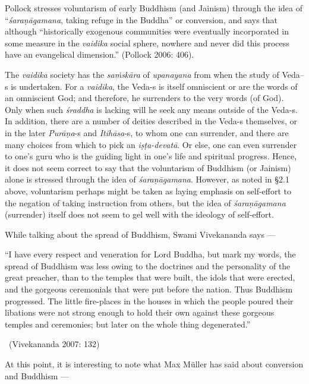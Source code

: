 Pollock stresses voluntarism of early Buddhism (and Jainism) through the idea of “\textit{śaraṇāgamana}, taking refuge in the Buddha” or conversion, and says that although “historically exogenous communities were eventually incorporated in some measure in the \textit{vaidika} social sphere, nowhere and never did this process have an evangelical dimension.” (Pollock 2006: 406).

The \textit{vaidika} society has the \textit{saṁskāra} of \textit{upanayana} from when the study of Veda--s is undertaken. For a \textit{vaidika}, the Veda-s is itself omniscient or are the words of an omniscient God; and therefore, he surrenders to the very words (of God). Only when such \textit{śraddha} is lacking will he seek any means outside of the Veda-s. In addition, there are a number of deities described in the Veda-s themselves, or in the later \textit{Purāṇa}-s and \textit{Itihāsa}-s, to whom one can surrender, and there are many choices from which to pick an \textit{iṣṭa-devatā}. Or else, one can even surrender to one’s guru who is the guiding light in one’s life and spiritual progress. Hence, it does not seem correct to say that the voluntarism of Buddhism (or Jainism) alone is stressed through the idea of \textit{śaraṇāgamana}. However, as noted in §2.1 above, voluntarism perhaps might be taken as laying emphasis on self-effort to the negation of taking instruction from others, but the idea of \textit{śaraṇāgamana} (surrender) itself does not seem to gel well with the ideology of self-effort.

While talking about the spread of Buddhism, Swami Vivekananda says —

\begin{myquote}
“I have every respect and veneration for Lord Buddha, but mark my words, the spread of Buddhism was less owing to the doctrines and the personality of the great preacher, than to the temples that were built, the idols that were erected, and the gorgeous ceremonials that were put before the nation. Thus Buddhism progressed. The little fire-places in the houses in which the people poured their libations were not strong enough to hold their own against these gorgeous temples and ceremonies; but later on the whole thing degenerated.” 

~\hfill (Vivekananda 2007: 132)
\end{myquote}

At this point, it is interesting to note what Max Müller has said about conversion and Buddhism —


